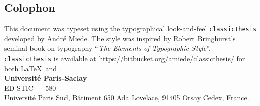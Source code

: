
\pagestyle{empty}


\vspace*{\fill}

\begin{addmargin}[-4.5cm]{2cm}

\section*{Colophon}
\noindent This document was typeset using the typographical look-and-feel
\texttt{cla\-ssic\-the\-sis} developed by Andr\'e Miede. The style was inspired
by Robert Bringhurst's seminal book on typography ``\emph{The Elements of
Typographic Style}''. \texttt{cla\-ssic\-the\-sis} is available at
\url{https://bitbucket.org/amiede/classicthesis/} for both \LaTeX\ and \mLyX. \\

\bigskip
\noindent\textbf{\color{PSaclay}Universit\'e Paris-Saclay} \\
ED STIC --- 580 \\
Universit\'e Paris Sud, B\^atiment 650 Ada Lovelace, 91405 Orsay Cedex, France.

\end{addmargin}

